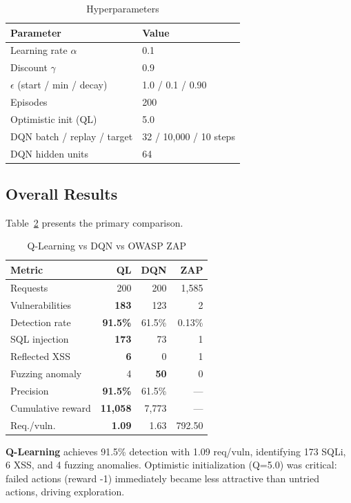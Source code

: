 \documentclass[5p,twocolumn]{elsarticle}
\begin{document}
\begin{table}[t]
\caption{Hyperparameters}
\centering
\label{tab:hyperparams}
\begin{tabular}{ll}
\toprule
Parameter & Value \\
\midrule
Learning rate $\alpha$ & 0.1 \\
Discount $\gamma$ & 0.9 \\
$\epsilon$ (start / min / decay) & 1.0 / 0.1 / 0.90 \\
Episodes & 200 \\
Optimistic init (QL) & 5.0 \\
DQN batch / replay / target & 32 / 10,000 / 10 steps \\
DQN hidden units & 64 \\
\bottomrule
\end{tabular}
\end{table}

\subsection{Overall Results}

Table~\ref{tab:main} presents the primary comparison.

\begin{table}[t]
\caption{Q-Learning vs DQN vs OWASP ZAP}
\centering
\label{tab:main}
\begin{tabular}{lrrr}
\toprule
Metric & QL & DQN & ZAP \\
\midrule
Requests & 200 & 200 & 1,585 \\
Vulnerabilities & \textbf{183} & 123 & 2 \\
Detection rate & \textbf{91.5\%} & 61.5\% & 0.13\% \\
SQL injection & \textbf{173} & 73 & 1 \\
Reflected XSS & \textbf{6} & 0 & 1 \\
Fuzzing anomaly & 4 & \textbf{50} & 0 \\
Precision & \textbf{91.5\%} & 61.5\% & --- \\
Cumulative reward & \textbf{11,058} & 7,773 & --- \\
Req./vuln. & \textbf{1.09} & 1.63 & 792.50 \\
\bottomrule
\end{tabular}
\end{table}

\noindent\textbf{Q-Learning} achieves 91.5\% detection with 1.09 req/vuln, identifying 173 SQLi, 6 XSS, and 4 fuzzing anomalies. Optimistic initialization (Q=5.0) was critical: failed actions (reward -1) immediately became less attractive than untried actions, driving exploration.
\end{document}
